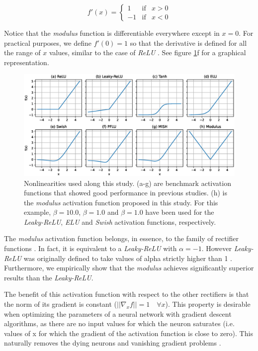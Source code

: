 $$
f'(x)= \left\{ \begin{array}{lcc}
1 &   \text{if}  & x > 0 \\
-1 &  \text{if} & x < 0
\end{array} \right.
$$

Notice that the \textit{modulus} function is differentiable everywhere except in $x = 0$. For practical purposes, we define $f'(0) = 1$ so that the derivative is defined for all the range of $x$ values, similar to the case of \textit{ReLU} \cite{Goodfellow2016}. See figure \ref{fig:activations}f for a graphical representation.


\begin{figure}
	\centering
	\includegraphics[width=1.0\linewidth]{modulus/images/activations}
	\caption{Nonlinearities used along this study. (a-g) are benchmark activation functions that showed good performance in previous studies. (h) is the \textit{modulus} activation function proposed in this study. For this example, $\beta=10.0$, $\beta=1.0$ and $\beta=1.0$ have been used for the \textit{Leaky-ReLU}, \textit{ELU} and \textit{Swish} activation functions, respectively.}
	\label{fig:activations}
\end{figure}

The \textit{modulus} activation function belongs, in essence, to the family of rectifier functions \cite{glorot2015} . In fact, it is equivalent to a \textit{Leaky-ReLU} with $\alpha=-1$. However \textit{Leaky-ReLU} was originally defined to take values of alpha strictly higher than 1 \cite{xu2015}. Furthermore, we empirically show that the \textit{modulus} achieves significantly superior results than the \textit{Leaky-ReLU}.

The benefit of this activation function with respect to the other rectifiers is that the norm of its gradient is constant ($||\nabla_x f|| = 1 \quad \forall x$). This property is desirable when optimizing the parameters of a neural network with gradient descent algorithms, as there are no input values for which the neuron saturates \cite{glorot2010} (i.e. values of x for which the gradient of the activation function is close to zero). This naturally removes the dying neurons \cite{lu2020} and vanishing gradient problems \cite{pascanu13, hochreiter1998, Hochreiter2001}.

